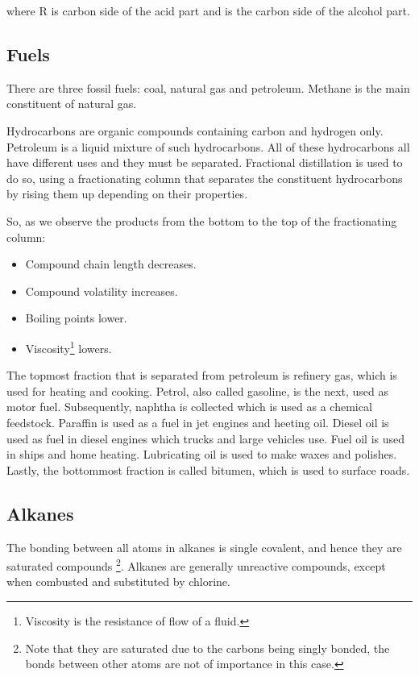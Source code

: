 \begin{center}
\end{center}
where R is carbon side of the acid part and  is the carbon side of the alcohol part.

\subsection{Fuels}

There are three fossil fuels: coal, natural gas and petroleum. Methane is the main constituent of
natural gas.

Hydrocarbons are organic compounds containing carbon and hydrogen only. Petroleum is a liquid mixture
of
such hydrocarbons. All of these hydrocarbons all have different uses and they must be separated.
Fractional distillation is used to do so, using a fractionating column that separates the 
constituent hydrocarbons by rising them up depending on their properties. 

So, as we observe the
products from the bottom to the top of the fractionating column:
\begin{itemize}
	\item Compound chain length decreases.
	\item Compound volatility increases.
	\item Boiling points lower.
	\item Viscosity\footnote{Viscosity is the resistance of flow of a fluid.} lowers.
\end{itemize}

The topmost fraction that is separated from petroleum is refinery gas, which is used for heating
and cooking. Petrol, also called gasoline, is the next, used as motor fuel. Subsequently, naphtha
is collected which is used as a chemical feedstock. Paraffin is used as a fuel in jet engines and
heeting oil. Diesel oil is used as fuel in diesel engines which trucks and large vehicles use. Fuel
oil is used in ships and home heating. Lubricating oil is used to make waxes and polishes. Lastly,
the bottommost fraction is called bitumen, which is used to surface roads.

\subsection{Alkanes}

The bonding between all atoms in alkanes is single covalent, and hence they are saturated compounds
\footnote{Note that they are saturated due to the carbons being singly bonded, the bonds between
other atoms are not of importance in this case.}. Alkanes are generally unreactive compounds, 
except when combusted and substituted by chlorine.

